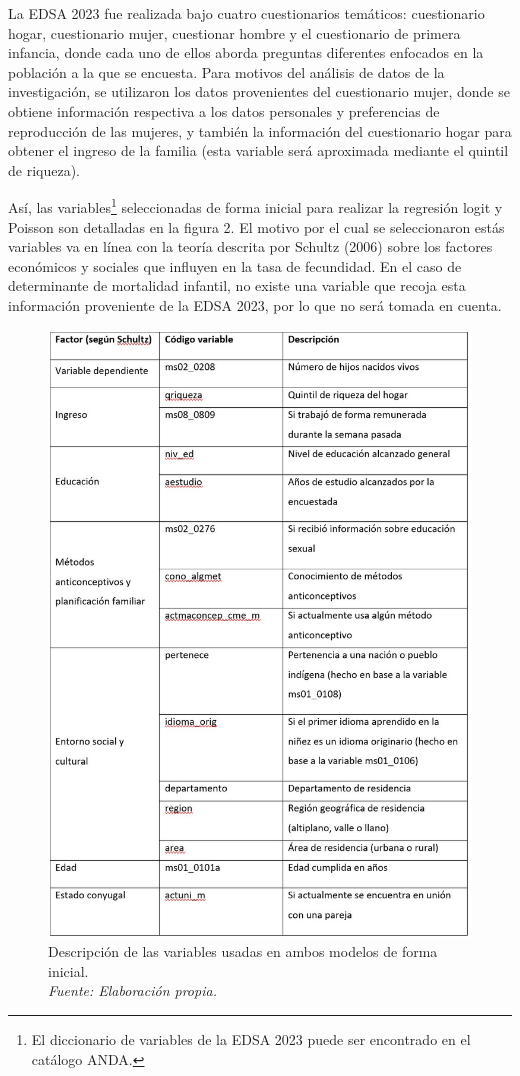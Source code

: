 \documentclass[Royal,times,sageh]{sagej}
\begin{document}
La EDSA 2023 fue realizada bajo cuatro cuestionarios temáticos:
cuestionario hogar, cuestionario mujer, cuestionar hombre y el
cuestionario de primera infancia, donde cada uno de ellos aborda
preguntas diferentes enfocados en la población a la que se encuesta.
Para motivos del análisis de datos de la investigación, se utilizaron
los datos provenientes del cuestionario mujer, donde se obtiene
información respectiva a los datos personales y preferencias de
reproducción de las mujeres, y también la información del cuestionario
hogar para obtener el ingreso de la familia (esta variable será
aproximada mediante el quintil de riqueza).

Así, las variables\footnote{El diccionario de variables de la EDSA 2023
  puede ser encontrado en el catálogo ANDA.} seleccionadas de forma
inicial para realizar la regresión logit y Poisson son detalladas en la
figura 2. El motivo por el cual se seleccionaron estás variables va en
línea con la teoría descrita por Schultz (2006) sobre los factores
económicos y sociales que influyen en la tasa de fecundidad. En el caso
de determinante de mortalidad infantil, no existe una variable que
recoja esta información proveniente de la EDSA 2023, por lo que no será
tomada en cuenta.

\begin{figure}

{\centering \includegraphics[width=0.9\linewidth]{imagenes/foto2} 

}

\caption{Descripción de las variables usadas en ambos modelos de forma inicial.\\\textit{Fuente: Elaboración propia.}}\label{fig:unnamed-chunk-2}
\end{figure}
\end{document}
